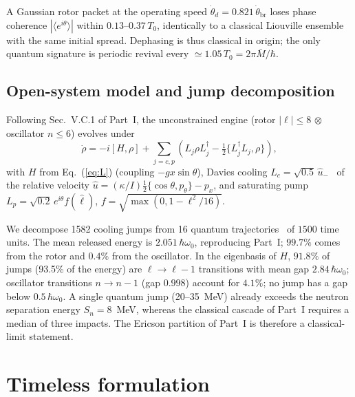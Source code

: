 \documentclass[aps,prc,twocolumn,superscriptaddress,amsmath,amssymb,nofootinbib]{revtex4-2}
\begin{document}
A Gaussian rotor packet at the operating speed $\dot\theta_d=0.821\,\dot\theta_{\text{br}}$ loses phase coherence $|\langle e^{i\theta}\rangle|$ within $0.13$--$0.37\,T_0$, identically to a classical Liouville ensemble with the same initial spread. Dephasing is thus classical in origin; the only quantum signature is periodic revival every $\simeq1.05\,T_0=2\pi\bar M/\hbar$.

\subsection{Open-system model and jump decomposition}
Following Sec.~V.C.1 of Part~I, the unconstrained engine (rotor $|\ell|\le8$ $\otimes$ oscillator $n\le6$) evolves under
\begin{equation}
\dot\rho=-i[H,\rho]+\sum_{j=c,p}\left(L_j\rho L_j^\dagger-\tfrac12\{L_j^\dagger L_j,\rho\}\right),
\label{eq:lindblad}
\end{equation}
with $H$ from Eq.~(\ref{eq:L}) (coupling $-gx\sin\theta$), Davies cooling $L_c=\sqrt{0.5}\,\hat u_-$~\cite{Davies1974} of the relative velocity $\hat u=(\kappa/I)\frac12\{\cos\theta,p_\theta\}-p_x$, and saturating pump $L_p=\sqrt{0.2}\,e^{i\theta}f(\hat\ell)$, $f=\sqrt{\max(0,1-\ell^2/16)}$.

We decompose 1582 cooling jumps from 16 quantum trajectories~\cite{Dalibard1992} of $1500$ time units. The mean released energy is $2.051\,\hbar\omega_0$, reproducing Part~I; $99.7\%$ comes from the rotor and $0.4\%$ from the oscillator. In the eigenbasis of $H$, $91.8\%$ of jumps (93.5\% of the energy) are $\ell\to\ell-1$ transitions with mean gap $2.84\,\hbar\omega_0$; oscillator transitions $n\to n-1$ (gap $0.998$) account for $4.1\%$; no jump has a gap below $0.5\,\hbar\omega_0$. A single quantum jump (20--35~MeV) already exceeds the neutron separation energy $S_n=8$~MeV, whereas the classical cascade of Part~I requires a median of three impacts. The Ericson partition of Part~I is therefore a classical-limit statement.

\section{Timeless formulation}
\label{sec:wdw}
\end{document}

